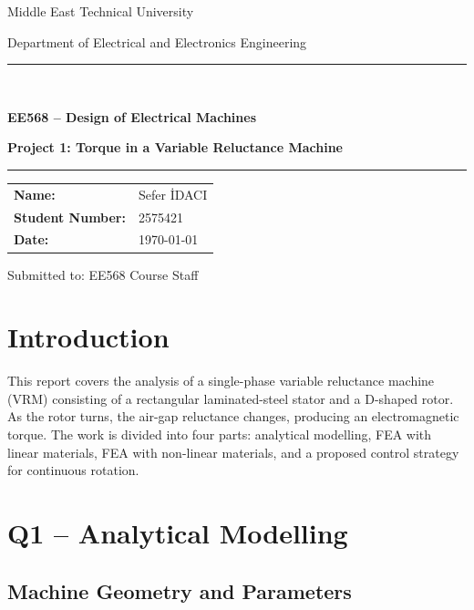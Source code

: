 \documentclass[12pt,a4paper]{article}
\begin{document}
\begin{titlepage}
  \centering
  \vspace*{3cm}
  {\Large Middle East Technical University \par}
  \vspace{0.4cm}
  {\large Department of Electrical and Electronics Engineering \par}
  \vspace{3cm}
  \rule{\linewidth}{0.5pt}\\[0.5cm]
  {\LARGE\bfseries EE568 -- Design of Electrical Machines \par}
  \vspace{0.4cm}
  {\Large\bfseries Project 1: Torque in a Variable Reluctance Machine \par}
  \rule{\linewidth}{0.5pt}
  \vspace{2cm}

  \begin{tabular}{ll}
    \textbf{Name:}           & Sefer \.{I}DACI \\[6pt]
    \textbf{Student Number:} & 2575421             \\[6pt]
    \textbf{Date:}           & \today              \\
  \end{tabular}

  \vfill
  {\small Submitted to: EE568 Course Staff}
\end{titlepage}

\section{Introduction}

This report covers the analysis of a single-phase variable reluctance
machine (VRM) consisting of a rectangular laminated-steel stator and a
D-shaped rotor. As the rotor turns, the air-gap reluctance changes,
producing an electromagnetic torque. The work is divided into four
parts: analytical modelling, FEA with linear materials, FEA with
non-linear materials, and a proposed control strategy for continuous
rotation.

\section{Q1 -- Analytical Modelling}

\subsection{Machine Geometry and Parameters}
\end{document}
